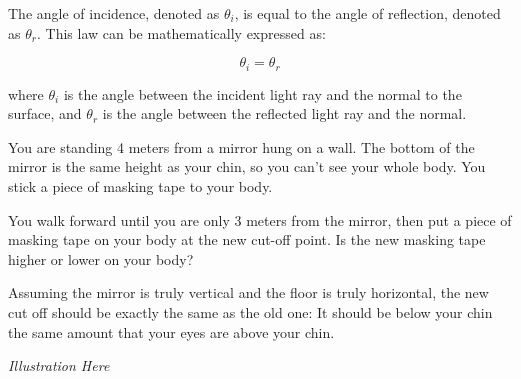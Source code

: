\begin{mdframed}[style=important, frametitle={Law of Reflection}]

The angle of incidence, denoted as $\theta_i$, is equal to
the angle of reflection, denoted as $\theta_r$. This law can be
mathematically expressed as:

$$\theta_i = \theta_r$$
 
where $\theta_i$ is the angle between the incident light ray and the
normal to the surface, and $\theta_r$ is the angle between the
reflected light ray and the normal.


\end{mdframed}

\begin{Exercise}[title={Law of Reflection}, label=law_of_reflection]

  You are standing 4 meters from a mirror hung on a wall.  The bottom
  of the mirror is the same height as your chin, so you can't see your
  whole body.  You stick a piece of masking tape to your body.

  You walk forward until you are only 3 meters from the mirror, then
  put a piece of masking tape on your body at the new cut-off point.  Is the new
  masking tape higher or lower on your body?
  
\end{Exercise}
\begin{Answer}[ref=law_of_reflection]

 Assuming the mirror is truly vertical and the floor is truly
 horizontal, the new cut off should be exactly the same as the old
 one: It should be below your chin the same amount that your eyes are
 above your chin.

 \textit{Illustration Here}

\end{Answer}

